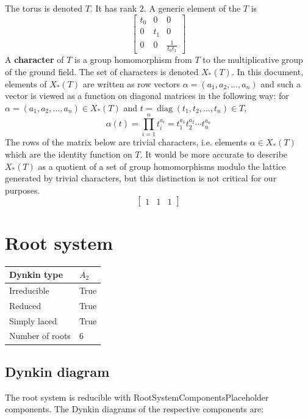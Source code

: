\documentclass[11pt]{article}
\newcommand{\tbf}{\textbf}
\DeclareMathOperator{\diag}{diag}
\theoremstyle{definition}
\newif\ifrootsystemirreducible
\begin{document}
The torus is denoted $T$. It has rank $2$. A generic element of the $T$ is
\[
\left[\begin{matrix}t_{0} & 0 & 0\\0 & t_{1} & 0\\0 & 0 & \frac{1}{t_{0} t_{1}}\end{matrix}\right]
\]
A \tbf{character} of $T$ is a group homomorphism from $T$ to the multiplicative group of the ground field. The set of characters is denoted $X_*(T)$. In this document, elements of $X_*(T)$ are written as row vectors $\alpha = (a_1, a_2, \ldots, a_n)$ and such a vector is viewed as a function on diagonal matrices in the following way: for $\alpha = (a_1, a_2, \ldots, a_n) \in X_*(T)$ and $t = \diag(t_1, t_2, \ldots, t_n) \in T$, 
\[
	\alpha(t) = \prod_{i=1}^n t_i^{a_i} = t_1^{a_1} t_2^{a_2} \cdots t_n^{a_n}
\]
The rows of the matrix below are trivial characters, i.e. elements $\alpha \in X_*(T)$ which are the identity function on $T$. It would be more accurate to describe $X_*(T)$ as a quotient of a set of group homomorphisms modulo the lattice generated by trivial characters, but this distinction is not critical for our purposes.
\[
\left[\begin{matrix}1 & 1 & 1\end{matrix}\right]
\]

\newpage
\section{Root system}

\begin{tabular}{|l|l|}
	\hline
    Dynkin type & $A_2$ \\
	\hline
    Irreducible & True \\
	\hline
    Reduced & True \\
	\hline
	Simply laced & True \\
	\hline
	Number of roots & $6$ \\
	\hline
\end{tabular}

\subsection{Dynkin diagram}

\ifrootsystemirreducible
The root system is irreducible and has Dynkin diagram:
\else
The root system is reducible with RootSystemComponentsPlaceholder components. The Dynkin diagrams of the respective components are:
\fi
\end{document}
